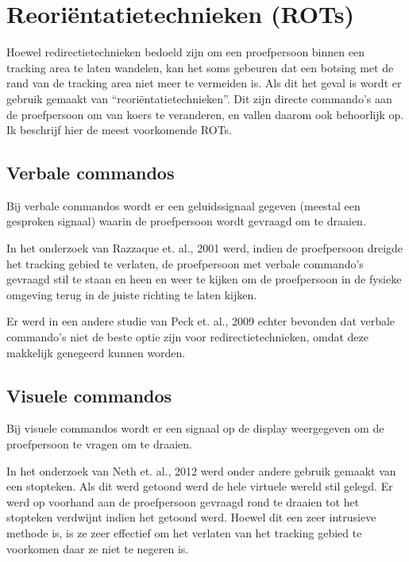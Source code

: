 \section{Reori\"entatietechnieken (ROTs)}
Hoewel redirectietechnieken bedoeld zijn om een proefpersoon binnen een tracking
area te laten wandelen, kan het soms gebeuren dat een botsing met de rand van de
tracking area niet meer te vermeiden is. Als dit het geval is wordt er gebruik
gemaakt van ``reori\"entatietechnieken''. Dit zijn directe commando's aan de
proefpersoon om van koers te veranderen, en vallen daarom ook behoorlijk op. Ik
beschrijf hier de meest voorkomende ROTs.


\subsection{Verbale commandos}
Bij verbale commandos wordt er een geluidssignaal gegeven (meestal een gesproken
signaal) waarin de proefpersoon wordt gevraagd om te draaien.

In het onderzoek van Razzaque et. al., 2001 \cite{kohn01} werd, indien de
proefpersoon dreigde het tracking gebied te verlaten, de proefpersoon met verbale
commando's gevraagd stil te staan en heen en weer te kijken om de proefpersoon in
de fysieke omgeving terug in de juiste richting te laten kijken.

Er werd in een andere studie van Peck et. al., 2009 \cite{peck09} echter bevonden 
dat verbale commando's niet de beste optie zijn voor redirectietechnieken, omdat
deze makkelijk genegeerd kunnen worden.


\subsection{Visuele commandos}
Bij visuele commandos wordt er een signaal op de display weergegeven om de 
proefpersoon te vragen om te draaien.

In het onderzoek van Neth et. al., 2012 \cite{neth12} werd onder andere gebruik 
gemaakt van een stopteken. Als dit werd getoond werd de hele virtuele wereld stil 
gelegd. Er werd op voorhand aan de proefpersoon gevraagd rond te draaien tot het 
stopteken verdwijnt indien het getoond werd. Hoewel dit een zeer intrusieve 
methode is, is ze zeer effectief om het verlaten van het tracking gebied te 
voorkomen daar ze niet te negeren is.


